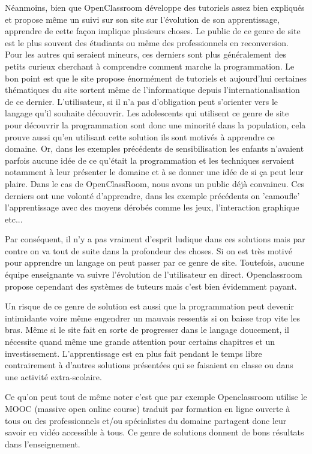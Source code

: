 Néanmoins, bien que OpenClassroom développe des tutoriels assez bien expliqués et propose même un suivi sur son site sur l'évolution de son apprentissage, apprendre de cette façon implique plusieurs choses. Le public de ce genre de site est le plus souvent des étudiants ou même des professionnels en reconversion. Pour les autres qui seraient mineurs, ces derniers sont plus généralement des petits curieux cherchant à comprendre comment marche la programmation. Le bon point est que le site propose énormément de tutoriels et aujourd'hui certaines thématiques du site sortent même de l'informatique depuis l'internationalisation de ce dernier. L'utilisateur, si il n'a pas d'obligation peut s'orienter vers le langage qu'il souhaite découvrir. Les adolescents qui utilisent ce genre de site pour découvrir la programmation sont donc une minorité dans la population, cela prouve aussi qu'en utilisant cette solution ils sont motivés à apprendre ce domaine. Or, dans les exemples précédents de sensibilisation les enfants n'avaient parfois aucune idée de ce qu'était la programmation et les techniques servaient notamment à leur présenter le domaine et à se donner une idée de si ça peut leur plaire. Dans le cas de OpenClassRoom, nous avons un public déjà convaincu. Ces derniers ont une volonté d'apprendre, dans les exemple précédents on 'camoufle' l'apprentissage avec des moyens dérobés comme les jeux, l'interaction graphique etc... 

Par conséquent, il n'y a pas vraiment d'esprit ludique dans ces solutions mais par contre on va tout de suite dans la profondeur des choses. Si on est très motivé pour apprendre un langage on peut passer par ce genre de site. Toutefois, aucune équipe enseignante va suivre l'évolution de l'utilisateur en direct. Openclassroom propose cependant des systèmes de tuteurs mais c'est bien évidemment payant.

Un risque de ce genre de solution est aussi que la programmation peut devenir intimidante  voire même engendrer un mauvais ressentis si on baisse trop vite les bras. Même si le site fait en sorte de progresser dans le langage doucement, il nécessite quand même une grande attention pour certains chapitres et un investissement. L'apprentissage est en plus fait pendant le temps libre contrairement à d'autres solutions présentées qui se faisaient en classe ou dans une activité extra-scolaire.

Ce qu'on peut tout de même noter c'est que par exemple Openclassroom utilise le MOOC (massive open online course) traduit par formation en ligne ouverte à tous ou des professionnels et/ou spécialistes du domaine partagent donc leur savoir en vidéo accessible à tous. Ce genre de solutions donnent de bons résultats dans l'enseignement. \cite{48}

